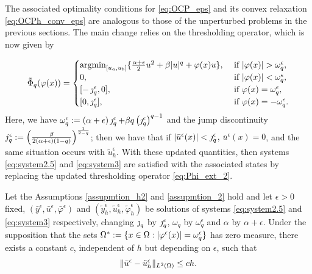 {The associated optimality conditions for \eqref{eq:OCP_eps} and its convex relaxation \eqref{eq:OCPh_conv_eps} are analogous to those of the unperturbed problems in the previous sections. The main change relies on the thresholding operator, which is now given by

\begin{equation}\label{eq:Phi_ext_2}
		\tilde\Phi_q (\varphi(x))  =	
		\begin{cases}
			\argmin_{[u_a,u_b]}\{\frac{\alpha+\epsilon}{2} u^2 + \beta|u|^{q} + \varphi(x) u\}, & \text{ if } |\varphi(x) |>\omega^\epsilon_q, \\
			0,                          &	 \text{ if } |\varphi(x) |<\omega^\epsilon_q, \\
			[-\jump^\epsilon_q, 0] ,                         &	 \text{ if } \varphi(x) =\omega^\epsilon_q,\\
			[0,\jump^\epsilon_q],                         &	 \text{ if } \varphi(x) =-\omega^\epsilon_q.
		\end{cases}
	\end{equation}
Here,  we have $\omega_q^{\epsilon}:=(\alpha+\epsilon)\operatorname{\jmath}_{q}^{\epsilon}+\beta q \left(\operatorname{\jmath}_q^{\epsilon}\right)^{q-1}$ and the jump discontinuity   $j_{q}^{\epsilon}:=\left(\frac{\beta}{2(\alpha+\epsilon)(1-q)}\right)^{\frac{1}{2-q}}$; then we have that if {$|\bar u^{\epsilon}(x)|<\operatorname{\jmath}_q^{\epsilon}$, $\bar u^{\epsilon}(x)=0$}, and the same situation occurs with $\tilde u_{h}^{\epsilon}$. With these updated quantities, then systems \eqref{eq:system2.5} and \eqref{eq:system3} are satisfied with the associated states by replacing the updated thresholding operator \eqref{eq:Phi_ext_2}.


\begin{theorem}\label{t:perturbed}
Let the Assumptions  \ref{assupmtion_h2} and \ref{assupmtion_2} hold and let  $\epsilon>0$ fixed, $(\bar y^{\epsilon}, \bar u^{\epsilon}, \bar\varphi^{\epsilon})$ and $(\tilde y_h^{\epsilon}, \tilde u_h^{\epsilon}, \tilde\varphi_h^{\epsilon})$ be  solutions of systems \eqref{eq:system2.5} and \eqref{eq:system3}
respectively, changing $\operatorname{\jmath}_q$ by $\operatorname{\jmath}_q^{\epsilon}$, $\omega_q$ by $\omega_q^{\epsilon}$ and $\alpha$ by $\alpha+\epsilon$. Under the supposition that the sets $\Omega^*:=\{x\in \Omega:|\varphi^{\epsilon}(x)|=\omega_q^{\epsilon}\}$ has zero measure, there exists a constant $c$, independent of $h$ but depending on $\epsilon$, such that 
\[
\lVert \bar u^{\epsilon}-\tilde u_{h}^{\epsilon} \rVert_{L^2(\Omega)}\le ch.
\]
\end{theorem}

}
